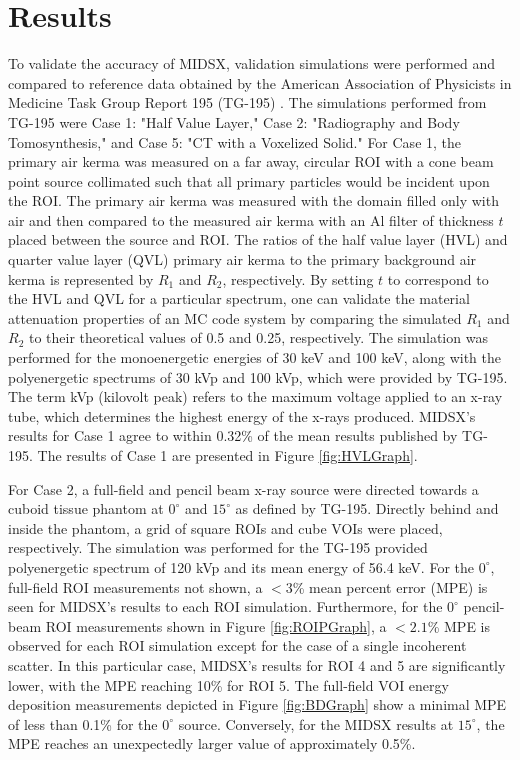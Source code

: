 \section{Results}
\par To validate the accuracy of MIDSX, validation simulations were performed and compared to reference data obtained by the American Association of Physicists in Medicine Task Group Report 195 (TG-195) \cite{sechopoulos_monte_2015}. The simulations performed from TG-195 were Case 1: "Half Value Layer," Case 2: "Radiography and Body Tomosynthesis," and Case 5: "CT with a Voxelized Solid." For Case 1, the primary air kerma was measured on a far away, circular ROI with a cone beam point source collimated such that all primary particles would be incident upon the ROI. The primary air kerma was measured with the domain filled only with air and then compared to the measured air kerma with an Al filter of thickness $t$ placed between the source and ROI. The ratios of the half value layer (HVL) and quarter value layer (QVL) primary air kerma to the primary background air kerma is represented by $R_1$ and $R_2$, respectively. By setting $t$ to correspond to the HVL and QVL for a particular spectrum, one can validate the material attenuation properties of an MC code system by comparing the simulated $R_1$ and $R_2$ to their theoretical values of 0.5 and 0.25, respectively. The simulation was performed for the monoenergetic energies of 30 keV and 100 keV, along with the polyenergetic spectrums of 30 kVp and 100 kVp, which were provided by TG-195. The term kVp (kilovolt peak) refers to the maximum voltage applied to an x-ray tube, which determines the highest energy of the x-rays produced. MIDSX's results for Case 1 agree to within 0.32\% of the mean results published by TG-195. The results of Case 1 are presented in Figure \ref{fig:HVLGraph}.
\par For Case 2, a full-field and pencil beam x-ray source were directed towards a cuboid tissue phantom at $0^\circ$ and $15^\circ$ as defined by TG-195. Directly behind and inside the phantom, a grid of square ROIs and cube VOIs were placed, respectively. The simulation was performed for the TG-195 provided polyenergetic spectrum of 120 kVp and its mean energy of 56.4 keV. For the $0^\circ$, full-field ROI measurements not shown, a $<3$\% mean percent error (MPE) is seen for MIDSX's results to each ROI simulation. Furthermore, for the $0^\circ$ pencil-beam ROI measurements shown in Figure \ref{fig:ROIPGraph}, a $<2.1$\% MPE is observed for each ROI simulation except for the case of a single incoherent scatter. In this particular case, MIDSX's results for ROI 4 and 5 are significantly lower, with the MPE reaching 10\% for ROI 5. The full-field VOI energy deposition measurements depicted in Figure \ref{fig:BDGraph} show a minimal MPE of less than 0.1\% for the $0^\circ$ source. Conversely, for the MIDSX results at $15^\circ$, the MPE reaches an unexpectedly larger value of approximately 0.5\%.
